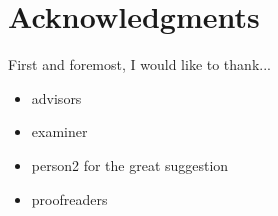 \chapter{Acknowledgments}

First and foremost, I would like to thank...
\begin{itemize}
\item{advisors}
\item{examiner}
\item{person2 for the great suggestion}
\item{proofreaders}
\end{itemize}